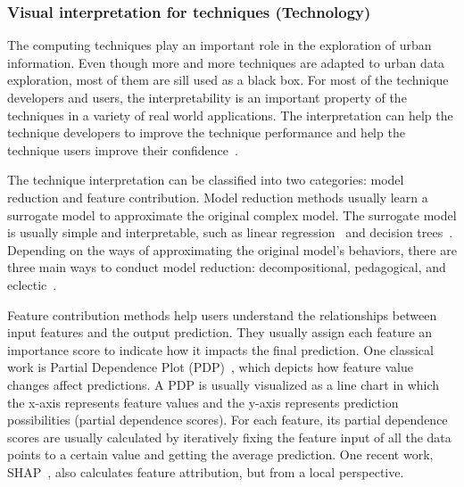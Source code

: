 \subsubsection{Visual interpretation for techniques (Technology)}
The computing techniques play an important role in the exploration of urban information. Even though more and more techniques are adapted to urban data exploration, most of them are sill used as a black box. For most of the technique developers and users, the interpretability is an important property of the techniques in a variety of real world applications. The interpretation can help the technique developers to improve the technique performance and help the technique users improve their confidence~\cite{strobelt2018lstmvis}. 

The technique interpretation can be classified into two categories: model reduction and feature contribution.
Model reduction methods usually learn a surrogate model to approximate the original complex model.
The surrogate model is usually simple and interpretable, such as linear regression~\cite{ribeiro2016should} and decision trees~\cite{craven1996extracting}. 
Depending on the ways of approximating the original model's behaviors, there are three main ways to conduct model reduction: decompositional, pedagogical, and eclectic~\cite{andrews1995survey}.

Feature contribution methods help users understand the relationships between input features and the output prediction.
They usually assign each feature an importance score to indicate how it impacts the final prediction.
One classical work is Partial Dependence Plot (PDP)~\cite{friedman2001greedy}, which depicts how feature value changes affect predictions.
A PDP is usually visualized as a line \textbf{}chart in which the x-axis represents feature values and the y-axis represents prediction possibilities (partial dependence scores).
For each feature, its partial dependence scores are usually calculated by iteratively fixing the feature input of all the data points to a certain value and getting the average prediction.
One recent work, SHAP~\cite{lundberg2017unified}, also calculates feature attribution, but from a local perspective.



